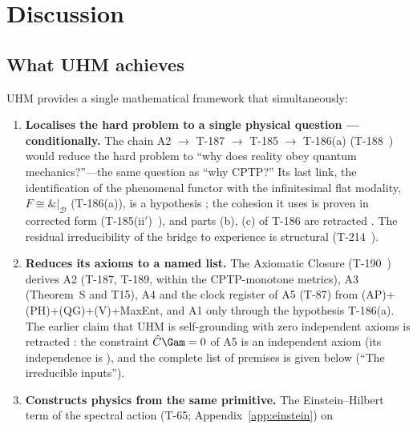 
\section{Discussion}
\label{sec:discussion}

\subsection{What UHM achieves}

UHM provides a single mathematical framework that simultaneously:

\begin{enumerate}[leftmargin=2em]
  \item \textbf{Localises the hard problem to a single physical question ---
        conditionally.} The chain A2 $\to$ T-187 $\to$ T-185 $\to$ T-186(a)
        (T-188~) would reduce the hard problem to ``why does
        reality obey quantum mechanics?''---the same question as ``why CPTP?'' Its
        last link, the identification of the phenomenal functor with the
        infinitesimal flat modality, $F \cong \&|_{\mathcal{D}}$ (T-186(a)), is a
        hypothesis ; the cohesion it uses is proven in corrected form
        (T-185(ii$'$)~), and parts (b), (c) of T-186 are retracted
        \status{$\times$}. The residual irreducibility of the bridge to experience is
        structural (T-214~).
  \item \textbf{Reduces its axioms to a named list.} The Axiomatic Closure
        (T-190~) derives
        A2 (T-187, T-189, within the CPTP-monotone metrics), A3 (Theorem~S and T15), A4 and the clock register of A5
        (T-87) from (AP)+(PH)+(QG)+(V)+MaxEnt, and A1 only through the hypothesis
        T-186(a). The earlier claim that UHM is self-grounding with zero independent
        axioms is retracted \status{$\times$}: the constraint $\hat C\Gam = 0$ of A5 is
        an independent axiom (its independence is ), and the complete list of
        premises is given below (``The irreducible inputs'').
  \item \textbf{Constructs physics from the same primitive.} The Einstein--Hilbert
        term of the spectral action (T-65; Appendix~\ref{app:einstein}) on

\end{enumerate}
